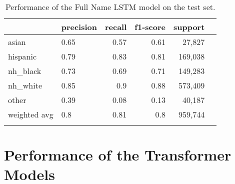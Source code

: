 \documentclass[12pt, letterpaper]{article}
\begin{document}
\begin{table}[h!]
\centering
\caption{Performance of the Full Name LSTM model on the test set.}
\begin{tabular}{llrrrr}
\hline
          & precision   &    recall &   f1-score &   support \\
\hline
 asian    & 0.65        &      0.57 &       0.61 &  27,827    \\
 hispanic & 0.79        &      0.83 &       0.81 & 169,038    \\
 nh\_black & 0.73        &      0.69 &       0.71 & 149,283    \\
 nh\_white & 0.85        &      0.9  &       0.88 & 573,409    \\
 other    & 0.39        &      0.08 &       0.13 &  40,187    \\
 weighted avg       &   0.8  &       0.81 &      0.8 & 959,744 \\
\hline
\label{table:lstm_full_name}
\end{tabular}
\end{table}

\clearpage
\section{Performance of the Transformer Models}\label{transformer_perf}
\end{document}
